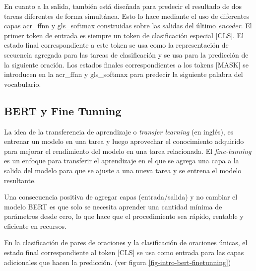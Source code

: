 En cuanto a la salida, también está diseñada para predecir el resultado de dos tareas diferentes de forma simultánea. Esto lo hace mediante el uso de diferentes capas \acrshort{acr_ffnn} y \gls{gls_softmax} construidas sobre las salidas del último \textit{encoder}. El primer token de entrada es siempre un token de clasificación especial [CLS]. El estado final correspondiente a este token se usa como la representación de secuencia agregada para las tareas de clasificación y se usa para la predicción de la siguiente oración. Los estados finales correspondientes a los tokens [MASK] se introducen en la \acrshort{acr_ffnn} y \gls{gls_softmax} para predecir la siguiente palabra del vocabulario.

\subsection{BERT y Fine Tunning}
\label{subsection-bert-finetunning}

La idea de la transferencia de aprendizaje o \textit{transfer learning} (en inglés), es entrenar un modelo en una tarea y luego aprovechar el conocimiento adquirido para mejorar el rendimiento del modelo en una tarea relacionada. El \textit{fine-tunning} es un enfoque para transferir el aprendizaje en el que se agrega una capa a la salida del modelo para que se ajuste a una nueva tarea y se entrena el modelo resultante.

Una consecuencia positiva de agregar capas (entrada/salida) y no cambiar el modelo BERT es que solo se necesita aprender una cantidad mínima de parámetros desde cero, lo que hace que el procedimiento sea rápido, rentable y eficiente en recursos.

En la clasificación de pares de oraciones y la clasificación de oraciones únicas, el estado final correspondiente al token [CLS] se usa como entrada para las capas adicionales que hacen la predicción. (ver figura \ref{fig-intro-bert-finetunning})

